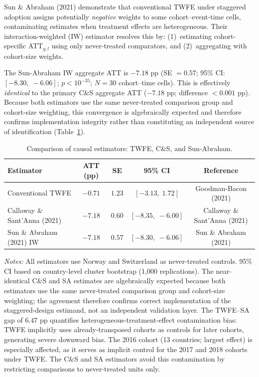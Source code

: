 \documentclass[11pt]{article}
\newcommand{\tabnoteblock}[1]{%
    \par\vspace{0.45em}%
    \begin{minipage}{0.98\linewidth}
    \footnotesize\raggedright #1
    \end{minipage}\par
}
\newcommand{\tabnotes}[1]{\tabnoteblock{\textit{Notes:} #1}}
\begin{document}
Sun \& Abraham (2021) demonstrate that conventional TWFE under staggered adoption assigns potentially \textit{negative} weights to some cohort--event-time cells, contaminating estimates when treatment effects are heterogeneous. Their interaction-weighted (IW) estimator resolves this by: (1)~estimating cohort-specific ATT$_{g,l}$ using only never-treated comparators, and (2)~aggregating with cohort-size weights.

The Sun-Abraham IW aggregate ATT is $\mathbf{-7.18}$ pp (SE $= 0.57$; 95\% CI: $[-8.30,\;-6.06]$; $p < 10^{-35}$; $N = 30$ cohort--time cells). This is effectively \textit{identical} to the primary C\&S aggregate ATT ($-7.18$ pp; difference $< 0.001$ pp). Because both estimators use the same never-treated comparison group and cohort-size weighting, this convergence is algebraically expected and therefore confirms implementation integrity rather than constituting an independent source of identification (Table~\ref{tab:estimator_comparison}).

\begin{table}[H]
\centering
\caption{Comparison of causal estimators: TWFE, C\&S, and Sun-Abraham.}
\label{tab:estimator_comparison}
\begin{tabular}{lcccc}
\toprule
\textbf{Estimator} & \textbf{ATT (pp)} & \textbf{SE} & \textbf{95\% CI} & \textbf{Reference} \\
\midrule
Conventional TWFE & $-0.71$ & $1.23$ & $[-3.13,\; 1.72]$ & Goodman-Bacon (2021) \\
Callaway \& Sant'Anna (2021) & $-7.18$ & $0.60$ & $[-8.35,\; -6.00]$ & Callaway \& Sant'Anna (2021) \\
Sun \& Abraham (2021) IW & $-7.18$ & $0.57$ & $[-8.30,\; -6.06]$ & Sun \& Abraham (2021) \\
\bottomrule
\end{tabular}
\tabnotes{All estimators use Norway and Switzerland as never-treated controls. 95\% CI based on country-level cluster bootstrap (1{,}000 replications). The near-identical C\&S and SA estimates are algebraically expected because both estimators use the same never-treated comparison group and cohort-size weighting; the agreement therefore confirms correct implementation of the staggered-design estimand, not an independent validation layer. The TWFE--SA gap of $6.47$ pp quantifies heterogeneous-treatment-effect contamination bias: TWFE implicitly uses already-transposed cohorts as controls for later cohorts, generating severe downward bias. The 2016 cohort (13 countries; largest effect) is especially affected, as it serves as implicit control for the 2017 and 2018 cohorts under TWFE. The C\&S and SA estimators avoid this contamination by restricting comparisons to never-treated units only.
}
\end{table}
\end{document}
